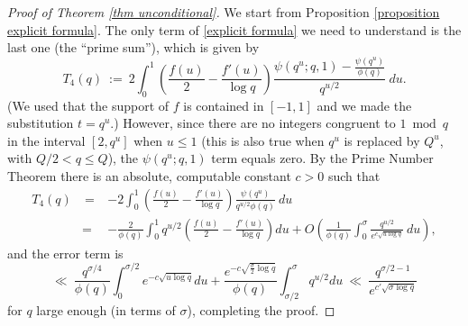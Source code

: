 \documentclass[12pt,reqno]{amsart}
\numberwithin{equation}{section}
\theoremstyle{plain}
\begin{document}
\begin{proof}[Proof of Theorem \ref{thm unconditional}]
We start from Proposition \ref{proposition explicit formula}. The only term of \eqref{explicit formula} we need to understand is the last one (the ``prime sum''), which is given by
\begin{equation} T_4(q) \ := \ 2 \int_0^{1} \left(\frac {f(u)}2 -\frac {f'(u)}{\log q}\right)\frac{\psi(q^u;q,1)-\frac{\psi(q^u)}{\phi(q)}}{q^{u/2}}\ du.\end{equation}
(We used that the support of $f$ is contained in $[-1,1]$ and we made the substitution $t=q^u$.) However, since there are no integers congruent to $1\bmod q$ in the interval $[2,q^u]$ when $u\leq 1$ (this is also true when $q^u$ is replaced by $Q^u$, with $Q/2<q\leq Q$), the $\psi(q^u;q,1)$ term equals zero. By the Prime Number Theorem there is an absolute, computable constant $c>0$ such that
\begin{eqnarray} T_4(q) & \ = \ &  -2 \int_0^{1} \left(\frac {f(u)}2 -\frac {f'(u)}{\log q}\right)\frac{\psi(q^u)}{q^{u/2}\phi(q)}\ du \nonumber\\ &= & -\frac 2{\phi(q)} \int_0^{1} q^{u/2}\left(\frac {f(u)}2 -\frac {f'(u)}{\log q}\right) du
+O\left( \frac 1{\phi(q)} \int_0^{\sigma} \frac{q^{u/2}}{e^{c\sqrt{u\log q}}}\ du\right),
\end{eqnarray}
and the error term is \begin{equation} \ll\ \frac{q^{\sigma/4}}{\phi(q)}\int_0^{\sigma/2} e^{-c\sqrt{u\log q}}du+\frac{e^{-c\sqrt{\frac{\sigma}2 \log q}}}{\phi(q)}\int_{\sigma/2}^{\sigma} q^{u/2}du\ \ll\ \frac{q^{\sigma/2-1}}{e^{c'\sqrt{\sigma\log q}}}
\end{equation}
for $q$ large enough (in terms of $\sigma$), completing the proof.
\end{proof}
\end{document}
